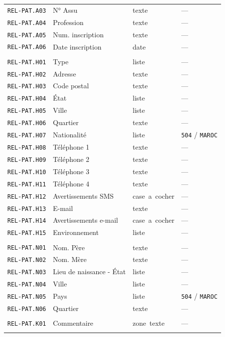 \begin{longtable}{@{}p{2.9cm}p{3.9cm}p{2.8cm}p{4.0cm}@{}}
\texttt{REL-PAT.A03} & N° Assu & texte & — \\
\texttt{REL-PAT.A04} & Profession & texte & — \\
\texttt{REL-PAT.A05} & Num. inscription & texte & — \\
\texttt{REL-PAT.A06} & Date inscription & date & — \\
\addlinespace
\multicolumn{4}{@{}l}{\textbf{Domicile}} \\
\texttt{REL-PAT.H01} & Type & liste & — \\
\texttt{REL-PAT.H02} & Adresse & texte & — \\
\texttt{REL-PAT.H03} & Code postal & texte & — \\
\texttt{REL-PAT.H04} & État & liste & — \\
\texttt{REL-PAT.H05} & Ville & liste & — \\
\texttt{REL-PAT.H06} & Quartier & texte & — \\
\texttt{REL-PAT.H07} & Nationalité & liste & \texttt{504} / \texttt{MAROC} \\
\texttt{REL-PAT.H08} & Téléphone 1 & texte & — \\
\texttt{REL-PAT.H09} & Téléphone 2 & texte & — \\
\texttt{REL-PAT.H10} & Téléphone 3 & texte & — \\
\texttt{REL-PAT.H11} & Téléphone 4 & texte & — \\
\texttt{REL-PAT.H12} & Avertissements SMS & case\ a\ cocher & — \\
\texttt{REL-PAT.H13} & E-mail & texte & — \\
\texttt{REL-PAT.H14} & Avertissements e-mail & case\ a\ cocher & — \\
\texttt{REL-PAT.H15} & Environnement & liste & — \\
\addlinespace
\multicolumn{4}{@{}l}{\textbf{Né}} \\
\texttt{REL-PAT.N01} & Nom. Père & texte & — \\
\texttt{REL-PAT.N02} & Nom. Mère & texte & — \\
\texttt{REL-PAT.N03} & Lieu de naissance - État & liste & — \\
\texttt{REL-PAT.N04} & Ville & liste & — \\
\texttt{REL-PAT.N05} & Pays & liste & \texttt{504} / \texttt{MAROC} \\
\texttt{REL-PAT.N06} & Quartier & texte & — \\
\addlinespace
\multicolumn{4}{@{}l}{\textbf{Commentaire}} \\
\texttt{REL-PAT.K01} & Commentaire & zone\ texte & — \\
\addlinespace
\bottomrule
\end{longtable}

